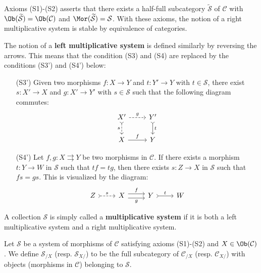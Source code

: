 \begin{remark}
Axioms (S1)-(S2) asserts that there exists a half-full subcategory $\widetilde{\mathcal{S}}$ of $\mathcal{C}$ with $\Ob(\widetilde{\mathcal{S}})=\Ob(\mathcal{C})$ and $\Mor(\widetilde{\mathcal{S}})=\mathcal{S}$. With these axioms, the notion of a right multiplicative system is stable by equivalence of categories.
\end{remark}
\begin{remark}
The notion of a \textbf{left multiplicative system} is defined similarly by reversing the arrows. This means that the condition (S3) and (S4) are replaced by the conditions (S3') and (S4') below:
\begin{enumerate}[leftmargin=40pt]
    \item[(S3')] Given two morphisms $f:X\to Y$ and $t:Y'\to Y$ with $t\in\mathcal{S}$, there exist $s:X'\to X$ and $g:X'\to Y'$ with $s\in\mathcal{S}$ such that the following diagram commutes:
    \[\begin{tikzcd}
    X'\ar[r,dashed,"g"]\ar[d,swap,dashed,"s",tail]&Y'\ar[d,"t",tail]\\
    X\ar[r,"f"]&Y
    \end{tikzcd}\]
    \item[(S4')] Let $f,g:X\rightrightarrows Y$ be two morphisms in $\mathcal{C}$. If there exists a morphism $t:Y\to W$ in $\mathcal{S}$ such that $tf=tg$, then there exists $s:Z\to X$ in $\mathcal{S}$ such that $fs=gs$. This is visualized by the diagram:
    \[\begin{tikzcd}
    Z\ar[r,dashed,"s",tail]&X\ar[r,shift left=3pt,"f"]\ar[r,shift right=3pt,swap,"g"]&Y\ar[r,"t",tail]&W
    \end{tikzcd}\]
\end{enumerate}
A collection $\mathcal{S}$ is simply called a \textbf{multiplicative system} if it is both a left multiplicative system and a right multiplicative system.
\end{remark}

Let $\mathcal{S}$ be a system of morphisms of $\mathcal{C}$ satisfying axioms (S1)-(S2) and $X\in\Ob(\mathcal{C})$. We define $\mathcal{S}_{/X}$ (resp. $\mathcal{S}_{X/}$) to be the full subcategory of $\mathcal{C}_{/X}$ (resp. $\mathcal{C}_{X/}$) with objects (morphisms in $\mathcal{C}$) belonging to $\mathcal{S}$.

